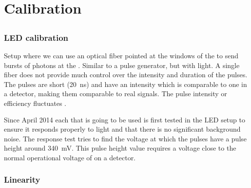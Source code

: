\chapter{Calibration}
\label{ch:calibration}

\section{\pmt}
\label{sec:pmt}


\subsection{LED calibration}
\label{sub:led_calibration}

Setup where we can use an optical fiber pointed at the windows of the
\pmt to send bursts of photons at the \pmt. Similar to a pulse
generator, but with light. A single fiber does not provide much control
over the intensity and duration of the pulses. The pulses are short
(\SI{20}{\nano\second}) and have an intensity which is comparable to one
\mip in a detector, making them comparable to real signals. The pulse
intensity or efficiency fluctuates .

Since April 2014 each \pmt that is going to be used is first tested in
the LED setup to ensure it responds properly to light and that there is
no significant background noise. The response test tries to find the
voltage at which the pulses have a pulse height around
\SI{340}{\milli\volt}. This pulse height value requires a voltage close
to the normal operational voltage of \pmts on a \hisparc detector.


\subsection{Linearity}

